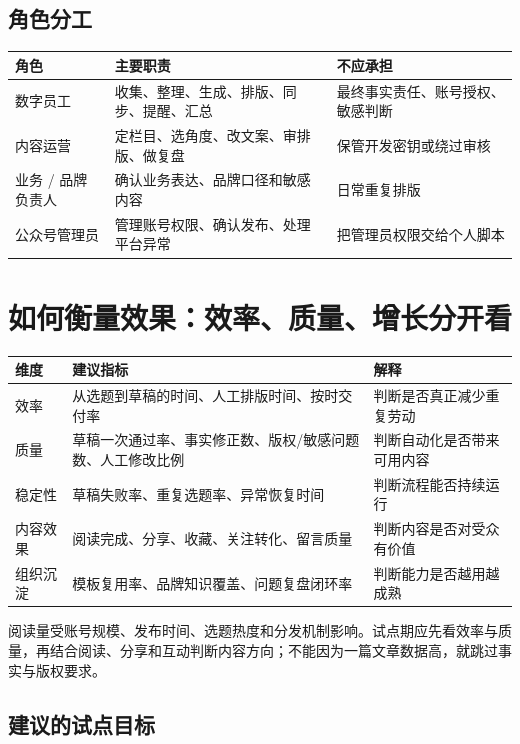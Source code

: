 \documentclass[UTF8,11pt,a4paper,fontset=none]{ctexart}
\begin{document}
\subsection{角色分工}

\begin{tabularx}{\textwidth}{@{}L{34mm} Y Y@{}}
\toprule
\textbf{角色} & \textbf{主要职责} & \textbf{不应承担} \\
\midrule
数字员工 & 收集、整理、生成、排版、同步、提醒、汇总 & 最终事实责任、账号授权、敏感判断 \\
内容运营 & 定栏目、选角度、改文案、审排版、做复盘 & 保管开发密钥或绕过审核 \\
业务 / 品牌负责人 & 确认业务表达、品牌口径和敏感内容 & 日常重复排版 \\
公众号管理员 & 管理账号权限、确认发布、处理平台异常 & 把管理员权限交给个人脚本 \\
\bottomrule
\end{tabularx}

\section{如何衡量效果：效率、质量、增长分开看}

\begin{tabularx}{\textwidth}{@{}L{27mm} L{43mm} Y@{}}
\toprule
\textbf{维度} & \textbf{建议指标} & \textbf{解释} \\
\midrule
效率 & 从选题到草稿的时间、人工排版时间、按时交付率 & 判断是否真正减少重复劳动 \\
质量 & 草稿一次通过率、事实修正数、版权/敏感问题数、人工修改比例 & 判断自动化是否带来可用内容 \\
稳定性 & 草稿失败率、重复选题率、异常恢复时间 & 判断流程能否持续运行 \\
内容效果 & 阅读完成、分享、收藏、关注转化、留言质量 & 判断内容是否对受众有价值 \\
组织沉淀 & 模板复用率、品牌知识覆盖、问题复盘闭环率 & 判断能力是否越用越成熟 \\
\bottomrule
\end{tabularx}

\begin{factbox}
阅读量受账号规模、发布时间、选题热度和分发机制影响。试点期应先看效率与质量，再结合阅读、分享和互动判断内容方向；不能因为一篇文章数据高，就跳过事实与版权要求。
\end{factbox}

\subsection{建议的试点目标}
\end{document}
